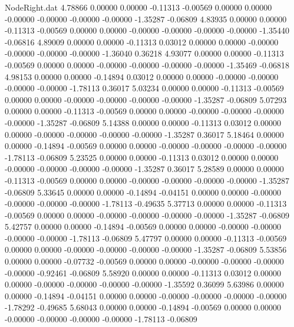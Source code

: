 \begin{filecontents}{NodeRight.dat}
   4.78866    0.00000    0.00000    -0.11313   -0.00569    0.00000    0.00000   -0.00000   -0.00000   -0.00000   -0.00000   -1.35287   -0.06809
   4.83935    0.00000    0.00000    -0.11313   -0.00569    0.00000    0.00000   -0.00000   -0.00000   -0.00000   -0.00000   -1.35440   -0.06816
   4.89009    0.00000    0.00000    -0.11313    0.03012    0.00000    0.00000   -0.00000   -0.00000   -0.00000   -0.00000   -1.36040    0.36218
   4.93077    0.00000    0.00000    -0.11313   -0.00569    0.00000    0.00000   -0.00000   -0.00000   -0.00000   -0.00000   -1.35469   -0.06818
   4.98153    0.00000    0.00000    -0.14894    0.03012    0.00000    0.00000   -0.00000   -0.00000   -0.00000   -0.00000   -1.78113    0.36017
   5.03234    0.00000    0.00000    -0.11313   -0.00569    0.00000    0.00000   -0.00000   -0.00000   -0.00000   -0.00000   -1.35287   -0.06809
   5.07293    0.00000    0.00000    -0.11313   -0.00569    0.00000    0.00000   -0.00000   -0.00000   -0.00000   -0.00000   -1.35287   -0.06809
   5.14388    0.00000    0.00000    -0.11313    0.03012    0.00000    0.00000   -0.00000   -0.00000   -0.00000   -0.00000   -1.35287    0.36017
   5.18464    0.00000    0.00000    -0.14894   -0.00569    0.00000    0.00000   -0.00000   -0.00000   -0.00000   -0.00000   -1.78113   -0.06809
   5.23525    0.00000    0.00000    -0.11313    0.03012    0.00000    0.00000   -0.00000   -0.00000   -0.00000   -0.00000   -1.35287    0.36017
   5.28589    0.00000    0.00000    -0.11313   -0.00569    0.00000    0.00000   -0.00000   -0.00000   -0.00000   -0.00000   -1.35287   -0.06809
   5.33645    0.00000    0.00000    -0.14894   -0.04151    0.00000    0.00000   -0.00000   -0.00000   -0.00000   -0.00000   -1.78113   -0.49635
   5.37713    0.00000    0.00000    -0.11313   -0.00569    0.00000    0.00000   -0.00000   -0.00000   -0.00000   -0.00000   -1.35287   -0.06809
   5.42757    0.00000    0.00000    -0.14894   -0.00569    0.00000    0.00000   -0.00000   -0.00000   -0.00000   -0.00000   -1.78113   -0.06809
   5.47797    0.00000    0.00000    -0.11313   -0.00569    0.00000    0.00000   -0.00000   -0.00000   -0.00000   -0.00000   -1.35287   -0.06809
   5.53856    0.00000    0.00000    -0.07732   -0.00569    0.00000    0.00000   -0.00000   -0.00000   -0.00000   -0.00000   -0.92461   -0.06809
   5.58920    0.00000    0.00000    -0.11313    0.03012    0.00000    0.00000   -0.00000   -0.00000   -0.00000   -0.00000   -1.35592    0.36099
   5.63986    0.00000    0.00000    -0.14894   -0.04151    0.00000    0.00000   -0.00000   -0.00000   -0.00000   -0.00000   -1.78292   -0.49685
   5.68043    0.00000    0.00000    -0.14894   -0.00569    0.00000    0.00000   -0.00000   -0.00000   -0.00000   -0.00000   -1.78113   -0.06809

\end{filecontents}
